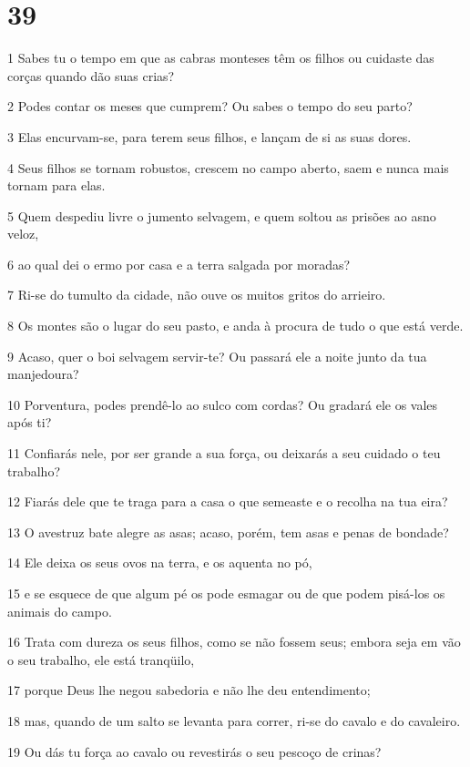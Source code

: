 \chapter{39}

\par 1 Sabes tu o tempo em que as cabras monteses têm os filhos ou cuidaste das corças quando dão suas crias?
\par 2 Podes contar os meses que cumprem? Ou sabes o tempo do seu parto?
\par 3 Elas encurvam-se, para terem seus filhos, e lançam de si as suas dores.
\par 4 Seus filhos se tornam robustos, crescem no campo aberto, saem e nunca mais tornam para elas.
\par 5 Quem despediu livre o jumento selvagem, e quem soltou as prisões ao asno veloz,
\par 6 ao qual dei o ermo por casa e a terra salgada por moradas?
\par 7 Ri-se do tumulto da cidade, não ouve os muitos gritos do arrieiro.
\par 8 Os montes são o lugar do seu pasto, e anda à procura de tudo o que está verde.
\par 9 Acaso, quer o boi selvagem servir-te? Ou passará ele a noite junto da tua manjedoura?
\par 10 Porventura, podes prendê-lo ao sulco com cordas? Ou gradará ele os vales após ti?
\par 11 Confiarás nele, por ser grande a sua força, ou deixarás a seu cuidado o teu trabalho?
\par 12 Fiarás dele que te traga para a casa o que semeaste e o recolha na tua eira?
\par 13 O avestruz bate alegre as asas; acaso, porém, tem asas e penas de bondade?
\par 14 Ele deixa os seus ovos na terra, e os aquenta no pó,
\par 15 e se esquece de que algum pé os pode esmagar ou de que podem pisá-los os animais do campo.
\par 16 Trata com dureza os seus filhos, como se não fossem seus; embora seja em vão o seu trabalho, ele está tranqüilo,
\par 17 porque Deus lhe negou sabedoria e não lhe deu entendimento;
\par 18 mas, quando de um salto se levanta para correr, ri-se do cavalo e do cavaleiro.
\par 19 Ou dás tu força ao cavalo ou revestirás o seu pescoço de crinas?
